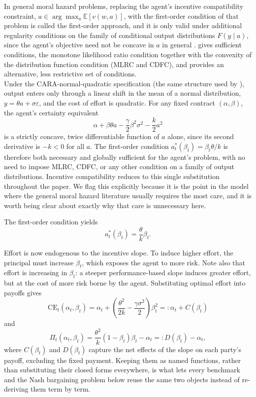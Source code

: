 \documentclass{article}
\theoremstyle{definition}
\theoremstyle{plain}
\begin{document}
In general moral hazard problems, replacing the agent's incentive compatibility constraint, $a \in \arg\max_a \mathbb{E}[v(w,a)]$, with the first-order condition of that problem is called the first-order approach, and it is only valid under
additional regularity conditions on the family of conditional output distributions $F(y\mid a)$, since the agent's objective need not be concave in $a$ in general \parencite{mirrlees1999}. \textcite{rogerson1985} gives sufficient conditions, the monotone likelihood ratio condition together with the convexity of the distribution function condition (MLRC and CDFC), and \textcite{jewitt1988} provides an alternative, less restrictive set of conditions. \\
Under the CARA-normal-quadratic specification (the same structure used by \textcite{holmstrom1987}), output enters only through a linear shift in the mean of a normal distribution, $y = \theta a + \sigma\varepsilon$, and the cost of effort is quadratic. For any fixed contract $(\alpha,\beta)$, the agent's certainty equivalent
\[
\alpha + \beta\theta a - \frac{\gamma}{2}\beta^2\sigma^2 - \frac{k}{2}a^2
\]
is a strictly concave, twice differentiable function of $a$ alone, since its second derivative is $-k < 0$ for all $a$. The first-order condition $a_t^*(\beta_t) = \beta_t\theta/k$ is therefore both necessary and globally sufficient for the agent's problem, with no need to impose MLRC, CDFC, or any other condition on a family of output distributions. Incentive compatibility reduces to this single substitution throughout the paper. We flag this explicitly because it is the point in the model where the general moral hazard literature usually requires the most care, and it is worth being clear about exactly why that care is unnecessary here.

The first-order condition yields
\[
a_t^*(\beta_t) = \frac{\theta}{k}\beta_t .
\]

Effort is now endogenous to the incentive slope. To induce higher effort, the principal must increase $\beta_t$, which exposes the agent to more risk. Note also that effort is increasing in $\beta_t$: a steeper performance-based slope induces greater effort, but at the cost of more risk borne by the agent. Substituting optimal effort into payoffs gives
\[
\text{CE}_t(\alpha_t, \beta_t) = \alpha_t + \left(\frac{ \theta^2}{2k} - \frac{\gamma \sigma^2}{2} \right)\beta^2_t=: \alpha_t + C(\beta_t)
\]
and
\[
\Pi_t(\alpha_t, \beta_t) = \dfrac{\theta^2}{k}(1-\beta_t)\beta_t - \alpha_t =: D(\beta_t) - \alpha_t,
\]
where $C(\beta_t)$ and $D(\beta_t)$ capture the net effects of the slope on each party's payoff, excluding the fixed payment. Keeping them as named functions, rather than substituting their closed forms everywhere, is what lets every benchmark and the Nash bargaining problem below reuse the same two objects instead of re-deriving them term by term.
\end{document}
